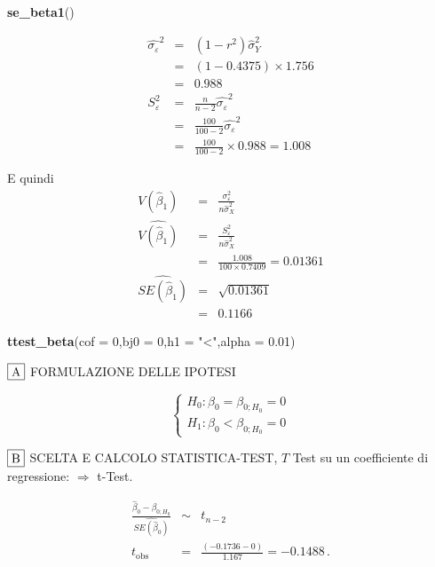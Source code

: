 \documentclass[
  11pt,
]{book}
\newenvironment{Shaded}{\begin{snugshade}}{\end{snugshade}}
\newcommand{\AttributeTok}[1]{\textcolor[rgb]{0.13,0.29,0.53}{#1}}
\newcommand{\DecValTok}[1]{\textcolor[rgb]{0.00,0.00,0.81}{#1}}
\newcommand{\FloatTok}[1]{\textcolor[rgb]{0.00,0.00,0.81}{#1}}
\newcommand{\FunctionTok}[1]{\textcolor[rgb]{0.13,0.29,0.53}{\textbf{#1}}}
\newcommand{\NormalTok}[1]{#1}
\newcommand{\StringTok}[1]{\textcolor[rgb]{0.31,0.60,0.02}{#1}}
\theoremstyle{mytheoremstyle}
\theoremstyle{mydefstyle}
\begin{document}
\begin{Shaded}
\begin{Highlighting}[]
\FunctionTok{se\_beta1}\NormalTok{()}
\end{Highlighting}
\end{Shaded}

\begin{eqnarray*}
\hat{\sigma_\varepsilon}^2&=&(1-r^2)\hat\sigma_Y^2\\
&=& (1- 0.4375 )\times 1.756 \\
   &=&  0.988 \\
   S_\varepsilon^2 &=& \frac{n} {n-2} \hat{\sigma_\varepsilon}^2\\
   &=&  \frac{ 100 } { 100 -2} \hat{\sigma_\varepsilon}^2 \\
 &=&  \frac{ 100 } { 100 -2} \times  0.988  =  1.008  
\end{eqnarray*}

E quindi\begin{eqnarray*}
V(\hat\beta_{1}) &=& \frac{\sigma_{\varepsilon}^{2}} {n \hat{\sigma}^{2}_{X}} \\
\widehat{V(\hat\beta_{1})} &=& \frac{S_{\varepsilon}^{2}} {n \hat{\sigma}^{2}_{X}} \\
 &=& \frac{ 1.008 } { 100 \times  0.7409 } =  0.01361 \\
 \widehat{SE(\hat\beta_{1})}        &=&  \sqrt{ 0.01361 }\\
 &=&  0.1166 
\end{eqnarray*}

\begin{Shaded}
\begin{Highlighting}[]
\FunctionTok{ttest\_beta}\NormalTok{(}\AttributeTok{cof =} \DecValTok{0}\NormalTok{,}\AttributeTok{bj0 =} \DecValTok{0}\NormalTok{,}\AttributeTok{h1 =} \StringTok{"\textless{}"}\NormalTok{,}\AttributeTok{alpha =} \FloatTok{0.01}\NormalTok{)}
\end{Highlighting}
\end{Shaded}

\(\fbox{A}\) FORMULAZIONE DELLE IPOTESI

\[\begin{cases}
   H_0: \beta_0 = \beta_{0;H_0}=0 \\
   H_1: \beta_0 < \beta_{0;H_0}=0 
   \end{cases}\]

\(\fbox{B}\) SCELTA E CALCOLO STATISTICA-TEST, \(T\)
Test su un coefficiente di regressione: \(\Rightarrow\) t-Test.

\begin{eqnarray*}
 \frac{\hat\beta_{ 0 } - \beta_{ 0 ;H_0}} {\widehat{SE(\hat\beta_{ 0 })}}&\sim&t_{n-2}\\
   t_{\text{obs}}
&=& \frac{ ( -0.1736 -  0 )} { 1.167 }
 =   -0.1488 \, .
\end{eqnarray*}
\end{document}
